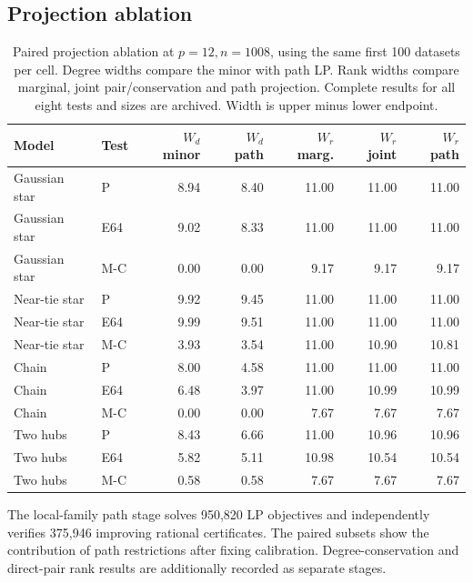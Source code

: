 \subsection{Projection ablation}
\begin{table}[htbp]\centering\small
\setlength{\tabcolsep}{4pt}
\caption{Paired projection ablation at $p=12,n=1008$, using the same first 100 datasets per cell. Degree widths compare the minor with path LP. Rank widths compare marginal, joint pair/conservation and path projection. Complete results for all eight tests and sizes are archived. Width is upper minus lower endpoint.}\label{tab:ablation}
\begin{lrbox}{\resultsbox}\begin{tabular}{llrrrrr}
\toprule
Model & Test & $W_d$ minor & $W_d$ path & $W_r$ marg. & $W_r$ joint & $W_r$ path\\
\midrule
Gaussian star & P & 8.94 & 8.40 & 11.00 & 11.00 & 11.00\\
Gaussian star & E64 & 9.02 & 8.33 & 11.00 & 11.00 & 11.00\\
Gaussian star & M-C & 0.00 & 0.00 & 9.17 & 9.17 & 9.17\\
Near-tie star & P & 9.92 & 9.45 & 11.00 & 11.00 & 11.00\\
Near-tie star & E64 & 9.99 & 9.51 & 11.00 & 11.00 & 11.00\\
Near-tie star & M-C & 3.93 & 3.54 & 11.00 & 10.90 & 10.81\\
Chain & P & 8.00 & 4.58 & 11.00 & 11.00 & 11.00\\
Chain & E64 & 6.48 & 3.97 & 11.00 & 10.99 & 10.99\\
Chain & M-C & 0.00 & 0.00 & 7.67 & 7.67 & 7.67\\
Two hubs & P & 8.43 & 6.66 & 11.00 & 10.96 & 10.96\\
Two hubs & E64 & 5.82 & 5.11 & 10.98 & 10.54 & 10.54\\
Two hubs & M-C & 0.58 & 0.58 & 7.67 & 7.67 & 7.67\\
\bottomrule\end{tabular}\end{lrbox}\ifdim\wd\resultsbox>\linewidth\resizebox{\linewidth}{!}{\usebox{\resultsbox}}\else\usebox{\resultsbox}\fi\end{table}
The local-family path stage solves 950{,}820 LP objectives and independently verifies 375{,}946 improving rational certificates. The paired subsets show the contribution of path restrictions after fixing calibration. Degree-conservation and direct-pair rank results are additionally recorded as separate stages.
